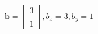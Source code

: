 \documentclass[preview]{standalone}
\begin{document}
\begin{align*}
\mathbf{b} = \begin{bmatrix}3 \\ \\ 1 \end{bmatrix}, b_x=3, b_y=1
\end{align*}
\end{document}
